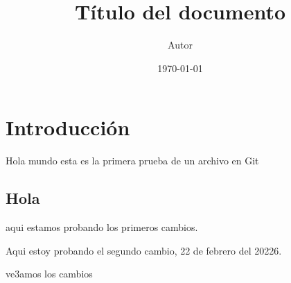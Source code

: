 \documentclass[12pt]{article}
\title{Título del documento}
\author{Autor}
\date{\today}
\begin{document}
\maketitle

\section{Introducción}
Hola mundo esta es la primera prueba de un archivo en Git

\subsection{Hola}
aqui estamos probando los primeros cambios.

Aqui estoy probando el segundo cambio, 22 de febrero del 20226.

ve3amos los cambios
\end{document}
